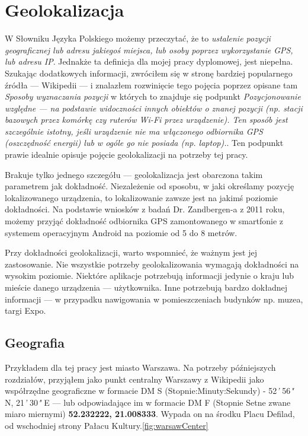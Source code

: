 \section{Geolokalizacja}
W Słowniku Języka Polskiego możemy przeczytać, że to \textit{ustalenie pozycji geograficznej lub adresu jakiegoś miejsca, lub osoby poprzez wykorzystanie GPS, lub adresu IP}\cite{GeolokalizacjaSJP}. Jednakże ta definicja dla mojej pracy dyplomowej, jest niepełna. Szukając dodatkowych informacji, zwróciłem się w stronę bardziej popularnego źródła — Wikipedii — i znalazłem rozwinięcie tego pojęcia poprzez opisane tam \textit{Sposoby wyznaczania pozycji} w których to znajduje się podpunkt \textit{Pozycjonowanie względne — na podstawie widoczności innych obiektów o znanej pozycji (np. stacji bazowych przez komórkę czy ruterów Wi-Fi przez urządzenie). Ten sposób jest szczególnie istotny, jeśli urządzenie nie ma włączonego odbiornika GPS (oszczędność energii) lub w ogóle go nie posiada (np. laptop).}\cite{GeolokalizacjaWiki}. Ten podpunkt prawie idealnie opisuje pojęcie geolokalizacji na potrzeby tej pracy.

Brakuje tylko jednego szczegółu — geolokalizacja jest obarczona takim parametrem jak dokładność. Niezależenie od sposobu, w jaki określamy pozycję lokalizowanego urządzenia, to lokalizowanie zawsze jest na jakimś poziomie dokładności. Na podstawie wniosków z badań Dr. Zandbergen-a z 2011 roku, możemy przyjąć dokładność odbiornika GPS zamontowanego w smartfonie z systemem operacyjnym Android na poziomie od 5 do 8 metrów.\cite{GpsAccurancyZandbergen}

Przy dokładności geolokalizacji, warto wspomnieć, że ważnym jest jej zastosowanie. Nie wszystkie potrzeby geolokalizowania wymagają dokładności na wysokim poziomie. Niektóre aplikacje potrzebują informacji jedynie o kraju lub mieście danego urządzenia — użytkownika. Inne potrzebują bardzo dokładnej informacji — w przypadku nawigowania w pomieszczeniach budynków np. muzea, targi Expo. %



\subsection{Geografia}
Przykładem dla tej pracy jest miasto Warszawa. Na potrzeby późniejszych rozdziałów, przyjąłem jako punkt centralny Warszawy z Wikipedii\cite{WarszawaWiki} jako współrzędne geograficzne w formacie DM S (Stopnie:Minuty:Sekundy) - 52\textit{'} 56\textit{"} N, 21\textit{'} 30\textit{"} E — lub odpowiadające im w formacie DM F (Stopnie Setne zwane miaro miernymi) \textbf{52.232222, 21.008333}. Wypada on na środku Placu Defilad, od wschodniej strony Pałacu Kultury.\ref{fig:warsawCenter}

